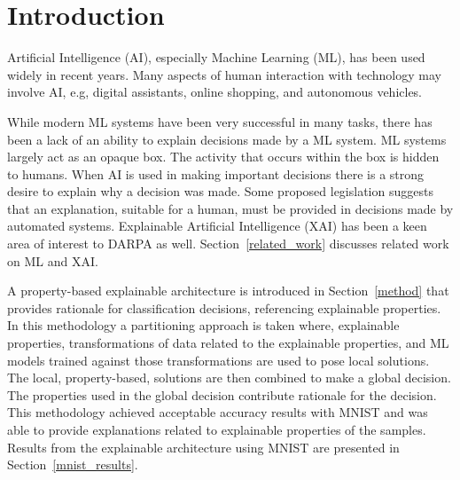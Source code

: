 \documentclass[conference]{IEEEtran}
\begin{document}
\section{Introduction}

Artificial Intelligence (AI), especially Machine Learning (ML), has been used
widely in recent years.  Many aspects of human interaction with technology may
involve AI, e.g, digital assistants, online shopping, and autonomous vehicles.

While modern ML systems have been very successful in many tasks, there has been
a lack of an ability to explain decisions made by a ML system. ML systems
largely act as an opaque box.  The activity that occurs within the box is hidden
to humans.  When AI is used in making important decisions there is a strong
desire to explain why a decision was made.  Some proposed legislation suggests
that an explanation, suitable for a human, must be provided in decisions made by
automated systems.  Explainable Artificial Intelligence (XAI) has been a keen
area of interest to DARPA\cite{Gunning_Aha_2019} as well.
Section~\ref{related_work} discusses related work on ML and XAI.


A property-based explainable architecture is introduced in Section~\ref{method}
that provides rationale for classification decisions, referencing explainable
properties.  In this methodology a partitioning approach is taken where,
explainable properties, transformations of data related to the explainable
properties, and ML models trained against those transformations are used to pose
local solutions.  The local, property-based, solutions are then combined to make
a global decision.  The properties used in the global decision contribute
rationale for the decision.  This methodology achieved acceptable accuracy
results with MNIST and was able to provide explanations related to explainable
properties of the samples.  Results from the explainable architecture using
MNIST are presented in Section~\ref{mnist_results}.
\end{document}
